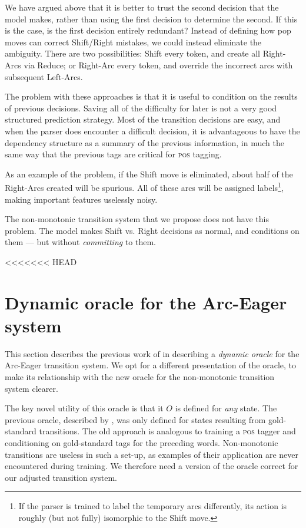 \documentclass[11pt,letterpaper]{article}
\newcommand{\pos}{\textsc{pos}\xspace}
\begin{document}
We have argued above that it is better to trust the second decision that the model
makes, rather than using the first decision to determine the second. If this is
the case, is the first decision entirely redundant?
Instead of defining how pop moves can correct Shift/Right mistakes, we could
instead eliminate the ambiguity. There are two possibilities:
Shift every token, and create all Right-Arcs via Reduce; or Right-Arc every token,
and override the incorrect arcs with subsequent Left-Arcs.

The problem with these approaches is that it is useful to condition
on the results of previous decisions. Saving all of the difficulty for later
is not a very good structured prediction strategy. Most of the transition decisions are
easy, and when the parser does encounter a difficult decision, it is advantageous
to have the dependency structure as a summary of the previous information, in
much the same way that the previous tags are critical for \pos tagging. 

As an example of the problem, if the Shift move is
eliminated, about half of the Right-Arcs created will be spurious. All of these
arcs will be assigned labels\footnote{If the parser is trained to label the temporary
arcs differently, its action is roughly (but not fully) isomorphic to the Shift move.},
making important features uselessly noisy.

The non-monotonic transition system that we propose does not have this problem.
The model makes Shift vs. Right decisions as normal, and conditions on them --- but
without \emph{committing} to them.


<<<<<<< HEAD

\section{Dynamic oracle for the Arc-Eager system}
\label{ref:oracle}

This section describes the previous work of \citet{goldberg:12} in describing
a \emph{dynamic oracle} for the Arc-Eager transition system.
We opt for a different presentation of the oracle,
to make its relationship with the new oracle for the non-monotonic transition
system clearer.

The key novel utility of this oracle is that it
$O$ is defined for \emph{any} state. The previous oracle, described by 
\citet{nivre:04}, was only defined for states resulting from gold-standard
transitions. The old approach is analogous to training a \pos tagger
and conditioning on gold-standard tags for the preceding words.
Non-monotonic transitions are useless in such a set-up, as examples of their
application are never encountered during training. We therefore need a version
of the oracle correct for our adjusted transition system.
\end{document}

